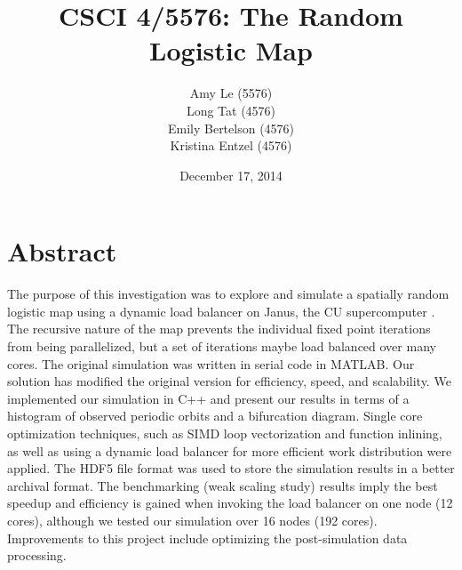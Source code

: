\documentclass[12pt]{article}
\begin{document}
\pagestyle{plain} %
\title{CSCI 4/5576: The Random Logistic Map}
\date{December 17, 2014}
\author{Amy Le (5576)\\Long Tat (4576)\\Emily Bertelson (4576)\\Kristina Entzel (4576)}
\maketitle
\section{Abstract}
The purpose of this investigation was to explore and simulate a
spatially random logistic map using a dynamic load balancer on Janus, the CU
supercomputer \cite{janus}. The recursive nature of the map prevents the individual
fixed point iterations from being parallelized, but a set of
iterations maybe load balanced over many cores. The original simulation was written in serial code in
MATLAB. Our solution has modified the original version for efficiency,
speed, and scalability. We implemented our simulation in C++ and present our
results in terms of a histogram of observed periodic orbits and a
bifurcation diagram. Single core optimization techniques,
such as SIMD loop vectorization and function inlining, as well as
using a dynamic load balancer for more efficient work distribution
were applied. The HDF5 file format was used to store the simulation results in a better archival format. The benchmarking (weak scaling study) results imply the best
speedup and efficiency is gained when invoking the load balancer on
one node (12 cores), although we tested our simulation over 16 nodes
(192 cores). Improvements to this project include optimizing the
post-simulation data processing. 
\end{document}
